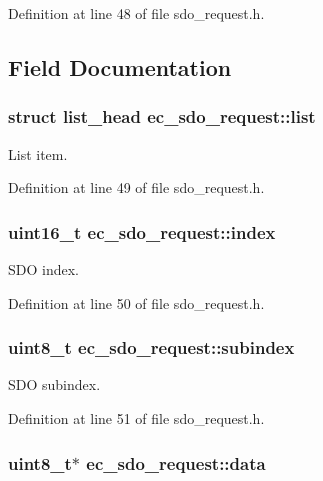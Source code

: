 Definition at line 48 of file sdo\-\_\-request.\-h.



\subsection{Field Documentation}
\subsubsection[{list}]{\setlength{\rightskip}{0pt plus 5cm}struct list\-\_\-head ec\-\_\-sdo\-\_\-request\-::list}\label{structec__sdo__request_a80c68878d98d613513a0b985be43198e}


List item. 



Definition at line 49 of file sdo\-\_\-request.\-h.

\subsubsection[{index}]{\setlength{\rightskip}{0pt plus 5cm}uint16\-\_\-t ec\-\_\-sdo\-\_\-request\-::index}\label{structec__sdo__request_ad8ef54b4c7495a17c81eabff59e079fd}


S\-D\-O index. 



Definition at line 50 of file sdo\-\_\-request.\-h.

\subsubsection[{subindex}]{\setlength{\rightskip}{0pt plus 5cm}uint8\-\_\-t ec\-\_\-sdo\-\_\-request\-::subindex}\label{structec__sdo__request_af3b7a335ce659260bed0d04f90ba9e4a}


S\-D\-O subindex. 



Definition at line 51 of file sdo\-\_\-request.\-h.

\subsubsection[{data}]{\setlength{\rightskip}{0pt plus 5cm}uint8\-\_\-t$\ast$ ec\-\_\-sdo\-\_\-request\-::data}\label{structec__sdo__request_aa1f9c68c95c5fde23ed0807abf884b08}


